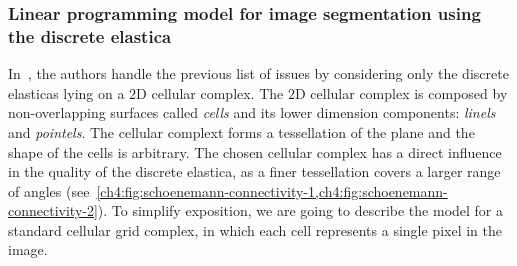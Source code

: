 \subsubsection{Linear programming model for image segmentation using the discrete elastica}

In~\cite{schoenemann09linear}, the authors handle the previous list of issues by considering only the discrete elasticas lying on a $2$D cellular complex. The $2$D cellular complex is composed by non-overlapping surfaces called \emph{cells} and its lower dimension components: \emph{linels} and \emph{pointels}. The cellular complext forms a tessellation of the plane and the shape of the cells is arbitrary. The chosen cellular complex has a direct influence in the quality of the discrete elastica, as a finer tessellation covers a larger range of angles (see~\cref{ch4:fig:schoenemann-connectivity-1,ch4:fig:schoenemann-connectivity-2}). To simplify exposition, we are going to describe the model for a standard cellular grid complex, in which each cell represents a single pixel in the image.

